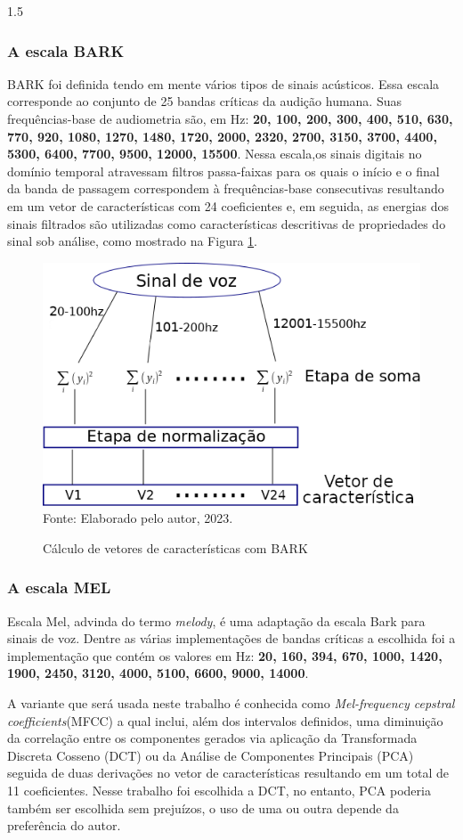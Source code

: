 \documentclass[a4paper,12pt,openright,oneside]{book}
\newenvironment{myenv}[1]
  {\begin{spacing}{#1}}
  {\end{spacing}}
\begin{document}
\begin{myenv}{1.5}
					\subsubsection{A escala BARK}
						\par BARK foi definida tendo em mente vários tipos de sinais acústicos. Essa escala corresponde ao conjunto de 25 bandas críticas da audição humana. Suas frequências-base de audiometria são, em Hz: \textbf{20, 100, 200, 300, 400, 510, 630, 770, 920, 1080, 1270, 1480, 1720, 2000, 2320, 2700, 3150, 3700, 4400, 5300, 6400, 7700, 9500, 12000, 15500}. Nessa escala,os sinais digitais no domínio temporal atravessam filtros passa-faixas \cite{bosi2002introduction} para os quais o início e o final da banda de passagem correspondem à frequências-base consecutivas resultando em um vetor de características com 24 coeficientes e, em seguida, as energias dos sinais filtrados são utilizadas como características descritivas de propriedades do sinal sob análise, como mostrado na Figura \ref{fig:barkfeaturevect}.
						\begin{figure}[h]
							\centering
							\caption{Cálculo de vetores de características com BARK}
							\includegraphics[width=0.6\linewidth]{images/barkFeatureVect}
							\label{fig:barkfeaturevect}
							\\Fonte: Elaborado pelo autor, 2023.
						\end{figure}
					\subsubsection{A escala MEL}
						\par Escala Mel, advinda do termo \textit{melody}, é uma adaptação da escala Bark para sinais de voz. Dentre as várias implementações de bandas críticas a escolhida foi a implementação que contém os valores em Hz: \textbf{20, 160, 394, 670, 1000, 1420, 1900, 2450, 3120, 4000, 5100, 6600, 9000, 14000}.
						
						\par A variante que será usada neste trabalho é conhecida como \textit{Mel-frequency cepstral coefficients}(MFCC) a qual inclui, além dos intervalos definidos, uma diminuição da correlação entre os componentes gerados via aplicação da Transformada Discreta Cosseno (DCT) \cite{salomon2007data} ou da Análise de Componentes Principais (PCA) \cite{jolliffe2006principal} seguida de duas derivações no vetor de características resultando em um total de 11 coeficientes. Nesse trabalho foi escolhida a DCT, no entanto, PCA poderia também ser escolhida sem prejuízos, o uso de uma ou outra depende da preferência do autor.
						

\end{myenv}
\end{document}
